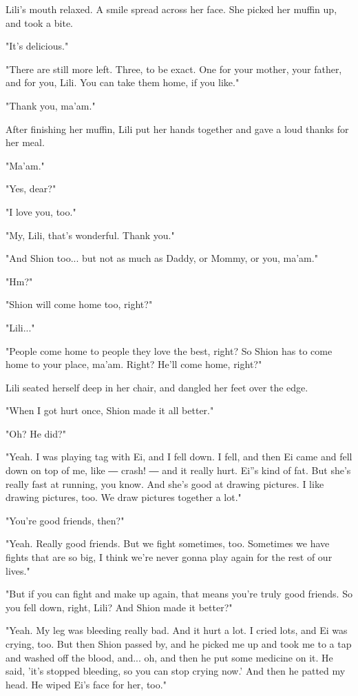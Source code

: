 Lili's mouth relaxed. A smile spread across her face. She picked her
muffin up, and took a bite.

"It's delicious."

"There are still more left. Three, to be exact. One for your mother,
your father, and for you, Lili. You can take them home, if you like."

"Thank you, ma'am."

After finishing her muffin, Lili put her hands together and gave a loud
thanks for her meal.

"Ma'am."

"Yes, dear?"

"I love you, too."

"My, Lili, that's wonderful. Thank you."

"And Shion too... but not as much as Daddy, or Mommy, or you, ma'am."

"Hm?"

"Shion will come home too, right?"

"Lili..."

"People come home to people they love the best, right? So Shion has to
come home to your place, ma'am. Right? He'll come home, right?"

Lili seated herself deep in her chair, and dangled her feet over the
edge.

"When I got hurt once, Shion made it all better."

"Oh? He did?"

"Yeah. I was playing tag with Ei, and I fell down. I fell, and then Ei
came and fell down on top of me, like ― crash! ― and it really hurt.
Ei''s kind of fat. But she's really fast at running, you know. And she's
good at drawing pictures. I like drawing pictures, too. We draw pictures
together a lot."

"You're good friends, then?"

"Yeah. Really good friends. But we fight sometimes, too. Sometimes we
have fights that are so big, I think we're never gonna play again for
the rest of our lives."

"But if you can fight and make up again, that means you're truly good
friends. So you fell down, right, Lili? And Shion made it better?"

"Yeah. My leg was bleeding really bad. And it hurt a lot. I cried lots,
and Ei was crying, too. But then Shion passed by, and he picked me up
and took me to a tap and washed off the blood, and... oh, and then he
put some medicine on it. He said, 'it's stopped bleeding, so you can
stop crying now.' And then he patted my head. He wiped Ei's face for
her, too."


